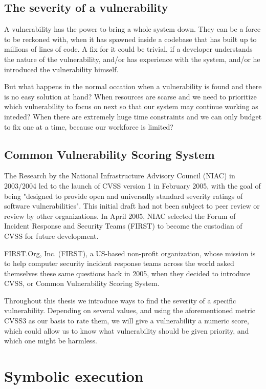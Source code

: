 \subsection{The severity of a vulnerability}

A vulnerability has the power to bring a whole system down. They can be a force to be reckoned with, when it has spawned inside a codebase that has built up to millions of lines of code. A fix for it could be trivial, if a developer understands the nature of the vulnerability, and/or has experience with the system, and/or he introduced the vulnerability himself. 

But what happens in the normal occation when a vulnerability is found and there is no easy solution at hand? When resources are scarse and we need to prioritize which vulnerability to focus on next so that our system may continue working as inteded?
When there are extremely huge time constraints and we can only budget to fix one at a time, because our workforce is limited?

\subsection{Common Vulnerability Scoring System}

The Research by the National Infrastructure Advisory Council (NIAC) in 2003/2004 led to the launch of CVSS version 1 in February 2005, with the goal of being "designed to provide open and universally standard severity ratings of software vulnerabilities". This initial draft had not been subject to peer review or review by other organizations. In April 2005, NIAC selected the Forum of Incident Response and Security Teams (FIRST) to become the custodian of CVSS for future development. 

FIRST.Org, Inc. (FIRST), a US-based non-profit organization, whose mission is to help computer security incident response teams across the world\parencite{cvss3} asked themselves these same questions back in 2005, when they decided to introduce CVSS, or Common Vulnerability Scoring System\parencite{cvss3}.

Throughout this thesis we introduce ways to find the severity of a specific vulnerability. Depending on several values, and using the aforementioned metric CVSS3 as our basis to rate them, we will give a vulnerability a numeric score, which could allow us to know what vulnerability should be given priority, and which one might be harmless.

\section{Symbolic execution}

